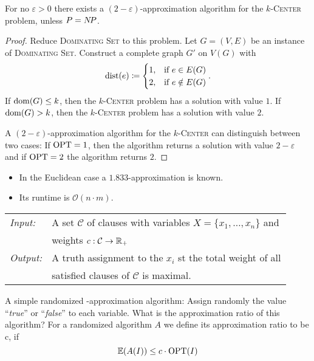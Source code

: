 \documentclass[../skript.tex]{subfiles}
\begin{document}
\begin{theorem} %
\label{thm:26}
For no $\varepsilon > 0$ there exists a $(2-\varepsilon)$-approximation algorithm for the \textsc{$k$-Center} problem, unless $P = N \! P$.
\end{theorem}
\begin{proof}
Reduce \textsc{Dominating Set} to this problem.
Let $G = (V, E)$ be an instance of \textsc{Dominating Set}.
Construct a complete graph $G'$ on $V(G)$ with
\[
	\operatorname*{dist}(e) \coloneqq \begin{cases}
	1, & \text{if } e \in E(G) \\
	2, & \text{if } e \notin E(G) \\
	\end{cases}.
\]
If $\operatorname{dom}(G) \leq k$, then the \textsc{$k$-Center} problem has a solution with value $1$.
If $\operatorname{dom}(G) > k$, then the \textsc{$k$-Center} problem has a solution with value $2$.

A $(2-\varepsilon)$-approximation algorithm for the \textsc{$k$-Center} can distinguish between two cases: If $\operatorname{OPT} = 1$, then the algorithm returns a solution with value $2 - \varepsilon$ and if $\operatorname{OPT} = 2$ the algorithm returns $2$.
\end{proof}
\begin{remark}
\begin{itemize}
\item In the Euclidean case a $1.833$-approximation is known.
\item Its runtime is $\mathcal{O}(n\cdot m)$.
\end{itemize}
\end{remark}
\begin{problem}
\begin{tabular}{@{}ll}
\textit{Input:} & A set $\mathcal{C}$ of clauses with variables $X = \{ x_1, \ldots, x_n \}$ and \\
& weights $c : \mathcal{C} \to \mathbb{R}_+$ \\
\textit{Output:} & A truth assignment to the $x_i$ \ac{st} the total weight of all \\
& satisfied clauses of $\mathcal{C}$ is maximal.
\end{tabular}
\end{problem}
A simple randomized -approximation algorithm: Assign randomly the value ``\textit{true}'' or ``\textit{false}'' to each variable.
What is the approximation ratio of this algorithm?
For a randomized algorithm $A$ we define its approximation ratio to be c, if
\[
	\mathbb{E}(A(I)) \leq c \cdot \operatorname{OPT}(I)
\]
\end{document}
